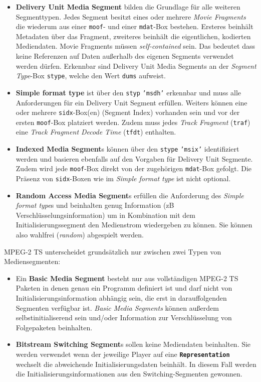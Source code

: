 \documentclass[paper = a4, fontsize = 12pt, parskip = half]{scrartcl} %
\def\attr#1{\texttt{#1}}
\def\elem#1{\texttt{\textbf{#1}}}
\begin{document}
\begin{itemize}
	\item \textbf{Delivery Unit Media Segment} bilden die Grundlage für alle weiteren Segmenttypen. Jedes Segment besitzt eines oder mehrere \textit{Movie Fragments} die wiederum aus einer \attr{moof}- und einer \attr{mdat}-Box bestehen. Ersteres beinhält Metadaten über das Fragment, zweiteres beinhält die eigentlichen, kodierten Mediendaten. Movie Fragments müssen \textit{self-contained} sein. Das bedeutet dass keine Referenzen auf Daten außerhalb des eigenen Segments verwendet werden dürfen. Erkennbar sind Delivery Unit Media Segments an der \textit{Segment Type}-Box \attr{stype}, welche den Wert \attr{dums} aufweist.
	\item \textbf{Simple format type} ist über den \attr{styp} \attr{'msdh'} erkennbar und muss alle Anforderungen für ein Delivery Unit Segment erfüllen. Weiters können eine oder mehrere \attr{sidx}-Box(en) (Segment Index) vorhanden sein und vor der ersten \attr{moof}-Box platziert werden. Zudem muss jedes \textit{Track Fragment} (\attr{traf}) eine \textit{Track Fragment Decode Time} (\attr{tfdt}) enthalten.
	\item \textbf{Indexed Media Segment}s können über den \attr{stype} \attr{'msix'} identifiziert werden und basieren ebenfalls auf den Vorgaben für Delivery Unit Segmente. Zudem wird jede \attr{moof}-Box direkt von der zugehörigen \attr{mdat}-Box gefolgt. Die Präsenz von \attr{sidx}-Boxen wie im \textit{Simple format type} ist nicht optional.
	\item \textbf{Random Access Media Segment}s erfüllen die Anforderung des \textit{Simple format type}s und beinhalten genug Information (zB Verschlüsselungsinformation) um in Kombination mit dem Initialisierungssegment den Medienstrom wiedergeben zu können. Sie können also wahlfrei (\textit{random}) abgespielt werden.
\end{itemize}

MPEG-2 TS unterscheidet grundsätzlich nur zwischen zwei Typen von Mediensegmenten:
\begin{itemize}
	\item Ein \textbf{Basic Media Segment} besteht nur aus vollständigen MPEG-2 TS Paketen in denen genau ein Programm definiert ist und darf nicht von Initialisierungsinformation abhängig sein, die erst in darauffolgenden Segmenten verfügbar ist. \textit{Basic Media Segments} können außerdem selbstinitialiserend sein und/oder Information zur Verschlüsselung von Folgepaketen beinhalten.
	\item \textbf{Bitstream Switching Segment}s sollen keine Mediendaten beinhalten. Sie werden verwendet wenn der jeweilige Player auf eine \elem{Representation} wechselt die abweichende Initialisierungsdaten beinhält. In diesem Fall werden die Initialisierungsinformationen aus den Switching-Segmenten gewonnen.
\end{itemize}
\end{document}

